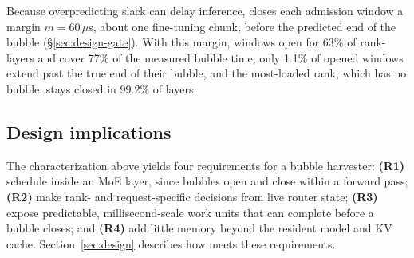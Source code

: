 
Because overpredicting slack can delay inference, \sys{} closes each
admission window a margin $m=60\,\mu$s, about one fine-tuning chunk, before
the predicted end of the bubble (\S\ref{sec:design-gate}). With this margin,
windows open for 63\% of rank-layers and cover 77\% of the measured bubble
time; only 1.1\% of opened windows extend past the true end of their
bubble, and the most-loaded rank, which has no bubble, stays closed in
99.2\% of layers.


\subsection{Design implications}
\label{sec:char-implications}

The characterization above yields four requirements for a bubble
harvester: \textbf{(R1)} schedule inside an \ac{MoE} layer, since bubbles
open and close within a forward pass; \textbf{(R2)} make rank- and
request-specific decisions from live router state; \textbf{(R3)} expose
predictable, millisecond-scale work units that can complete before a
bubble closes; and \textbf{(R4)} add little memory beyond the resident
model and \ac{KV} cache. Section~\ref{sec:design} describes how \sys{}
meets these requirements.
